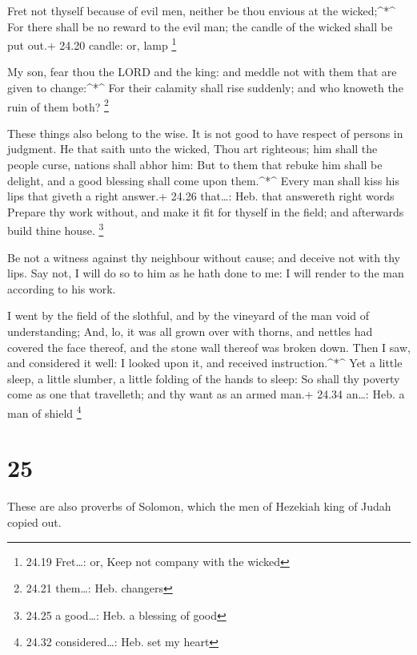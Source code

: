  Fret not thyself because of evil men, neither be thou
envious at the wicked;\^{}*\^{}  For there shall be no
reward to the evil man; the candle of the wicked shall be put out.+
24.20 candle: or, lamp \footnote{24.19 Fret\ldots: or, Keep not company
  with the wicked}

 My son, fear thou the LORD and the king: and meddle not
with them that are given to change:\^{}*\^{}  For their
calamity shall rise suddenly; and who knoweth the ruin of them both?
\footnote{24.21 them\ldots: Heb. changers}

 These things also belong to the wise. It is not good to
have respect of persons in judgment.  He that saith unto
the wicked, Thou art righteous; him shall the people curse, nations
shall abhor him:  But to them that rebuke him shall be
delight, and a good blessing shall come upon them.\^{}*\^{}
 Every man shall kiss his lips that giveth a right answer.+
24.26 that\ldots: Heb. that answereth right words  Prepare
thy work without, and make it fit for thyself in the field; and
afterwards build thine house. \footnote{24.25 a good\ldots: Heb. a
  blessing of good}

 Be not a witness against thy neighbour without cause; and
deceive not with thy lips.  Say not, I will do so to him as
he hath done to me: I will render to the man according to his work.

 I went by the field of the slothful, and by the vineyard
of the man void of understanding;  And, lo, it was all
grown over with thorns, and nettles had covered the face thereof, and
the stone wall thereof was broken down.  Then I saw, and
considered it well: I looked upon it, and received instruction.\^{}*\^{}
 Yet a little sleep, a little slumber, a little folding of
the hands to sleep:  So shall thy poverty come as one that
travelleth; and thy want as an armed man.+ 24.34 an\ldots: Heb. a man of
shield \footnote{24.32 considered\ldots: Heb. set my heart}

\hypertarget{section-24}{%
\section{25}\label{section-24}}

 These are also proverbs of Solomon, which the men of
Hezekiah king of Judah copied out.

